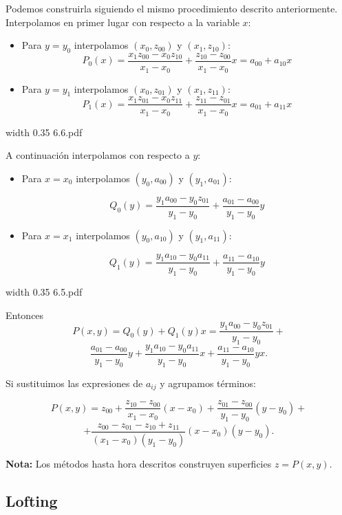 \documentclass[twoside]{report}
\newcommand{\colocapdf}[2]{\quad\pdfimage width #2 {#1.pdf}}
\begin{document}
Podemos construirla siguiendo el mismo procedimiento descrito anteriormente. Interpolamos en primer lugar con respecto a la variable $x$:
\begin{itemize}
\item Para $y=y_0$ interpolamos $(x_0,z_{00})$ y $(x_1,z_{10})$:
$$P_0(x)=\frac{x_1 z_{00}-x_0 z_{10}}{x_1-x_0}+\frac{z_{10}-z_{00}}{x_1-x_0}x=a_{00}+a_{10}x$$
\item Para $y=y_1$ interpolamos $(x_0,z_{01})$ y $(x_1,z_{11})$:
$$P_1(x)=\frac{x_1 z_{01}-x_0 z_{11}}{x_1-x_0}+\frac{z_{11}-z_{01}}{x_1-x_0}x=a_{01}+a_{11}x$$
\end{itemize}

\begin{center}
\colocapdf{6.6}{0.35\textwidth}
\end{center}

A continuaci\'{o}n interpolamos con respecto a $y$:
\begin{itemize}
\item Para $x=x_0$ interpolamos $(y_0,a_{00})$ y $(y_1,a_{01})$:

$$Q_0(y)=\frac{y_1 a_{00}-y_0 z_{01}}{y_1-y_0}+\frac{a_{01}-a_{00}}{y_1-y_0}y$$
\item Para $x=x_1$ interpolamos $(y_0,a_{10})$ y $(y_1,a_{11})$:

$$Q_1(y)=\frac{y_1 a_{10}-y_0 a_{11}}{y_1-y_0}+\frac{a_{11}-a_{10}}{y_1-y_0}y$$

\end{itemize}

\begin{center}
\colocapdf{6.5}{0.35\textwidth}
\end{center}

Entonces
$$P(x,y)=Q_0(y)+Q_1(y)x=\frac{y_1 a_{00}-y_0 z_{01}}{y_1-y_0}+$$
$$\frac{a_{01}-a_{00}}{y_1-y_0}y+\frac{y_1 a_{10}-y_0 a_{11}}{y_1-y_0}x+\frac{a_{11}-a_{10}}{y_1-y_0}yx.$$

Si sustituimos las expresiones de $a_{ij}$ y agrupamos t\'{e}rminos:

$$P(x,y)=z_{00}+\frac{z_{10}- z_{00}}{x_1-x_0}(x-x_0)+\frac{z_{01}-z_{00}}{y_1-y_0}(y-y_0)+$$
$$+\frac{z_{00}-z_{01}-z_{10}+z_{11}}{(x_1-x_0)(y_1-y_0)}(x-x_0)(y-y_0).$$

{\bf Nota:} Los m\'{e}todos hasta hora descritos construyen superficies $z=P(x,y).$

\subsection{Lofting}
\end{document}
